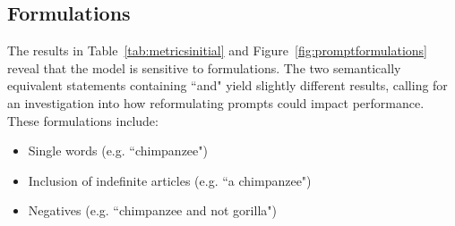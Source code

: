 \documentclass[author={Jacob Stephenson},
    degree={BSc},
    title={Robust Great Ape Species Detection in Wild Camera Trap Imagery with Promptable Concept Segmentation},
    unit={COMS30045},
    subtitle={}]{dissertation}
\begin{document}
\subsection{Formulations}
\label{subsec:prompt_formulations}

The results in Table~\ref{tab:metricsinitial} and Figure~\ref{fig:promptformulations} reveal that the model is sensitive to formulations. The two semantically equivalent statements containing ``and" yield slightly different results, calling for an investigation into how reformulating prompts could impact performance. These formulations include:

\begin{itemize}
    \item Single words (e.g. ``chimpanzee")
    \item Inclusion of indefinite articles (e.g. ``a chimpanzee")
    \item Negatives (e.g. ``chimpanzee and not gorilla")
\end{itemize}
\end{document}

